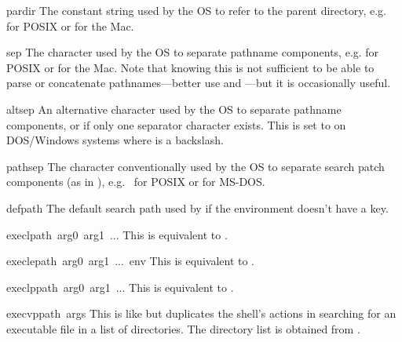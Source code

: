 \begin{datadesc}{pardir}
The constant string used by the OS to refer to the parent directory,
e.g.  for POSIX or  for the Mac.
\end{datadesc}

\begin{datadesc}{sep}
The character used by the OS to separate pathname components,
e.g.  for POSIX or  for the Mac.  Note that knowing this
is not sufficient to be able to parse or concatenate pathnames---better
use  and ---but it is
occasionally useful.
\end{datadesc}

\begin{datadesc}{altsep}
An alternative character used by the OS to separate pathname components,
or  if only one separator character exists.  This is set to
 on DOS/Windows systems where  is a backslash.
\end{datadesc}

\begin{datadesc}{pathsep}
The character conventionally used by the OS to separate search patch
components (as in ), e.g.\  for POSIX or
 for MS-DOS.
\end{datadesc}

\begin{datadesc}{defpath}
The default search path used by  if the environment
doesn't have a  key.
\end{datadesc}

\begin{funcdesc}{execl}{path\, arg0\, arg1\, ...}
This is equivalent to
.
\end{funcdesc}

\begin{funcdesc}{execle}{path\, arg0\, arg1\, ...\, env}
This is equivalent to
.
\end{funcdesc}

\begin{funcdesc}{execlp}{path\, arg0\, arg1\, ...}
This is equivalent to
.
\end{funcdesc}

\begin{funcdesc}{execvp}{path\, args}
This is like  but duplicates
the shell's actions in searching for an executable file in a list of
directories.  The directory list is obtained from
.
\end{funcdesc}


